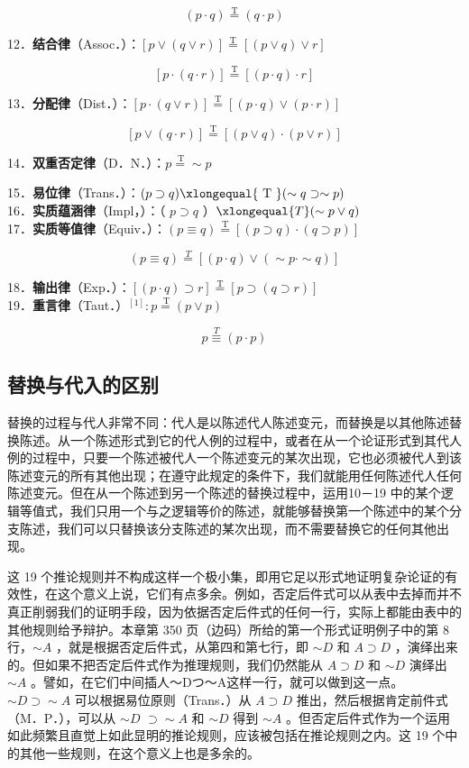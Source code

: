 $$
(p \cdot q) \stackrel{\mathrm{T}}{=}(q \cdot p)
$$

12．\textbf{结合律}（Assoc．）：$[p \vee(q \vee r)] \stackrel{\mathrm{T}}{=}[(p \vee q) \vee r]$

$$
[p \cdot(q \cdot r)] \stackrel{\mathrm{T}}{=}[(p \cdot q) \cdot r]
$$

13．\textbf{分配律}（Dist．）：$[p \cdot(q \vee r)] \stackrel{\mathrm{T}}{=}[(p \cdot q) \vee(p \cdot r)]$

$$
[p \vee(q \cdot r)] \stackrel{\mathrm{T}}{=}[(p \vee q) \cdot(p \vee r)]
$$

14．\textbf{双重否定律}（D．N．）：$p \stackrel{\mathrm{~T}}{=} \sim p$

15．\textbf{易位律}（Trans．）：$(p \supset q) \xlongequal{\text { T }}(\sim q \supset \sim p)$\\
16．\textbf{实质蕴涵律}（Impl，）：（ $p \supset q$ ）$\xlongequal{T}(\sim p \vee q)$\\
17．\textbf{实质等值律}（Equiv．）：$(p \equiv q) \stackrel{\mathrm{T}}{=}[(p \supset q) \cdot(q \supset p)]$

$$
(p \equiv q) \stackrel{T}{=}[(p \cdot q) \vee(\sim p \cdot \sim q)]
$$

18．\textbf{输出律}（Exp．）：$[(p \cdot q) \supset r] \stackrel{\mathrm{T}}{=}[p \supset(q \supset r)]$\\
19．\textbf{重言律}（Taut．）${ }^{[1]}: p \stackrel{\mathrm{~T}}{=}(p \vee p)$

$$
p \stackrel{T}{\equiv}(p \cdot p)
$$

\subsection{替换与代入的区别}

替换的过程与代人非常不同：代人是以陈述代人陈述变元，而替换是以其他陈述替换陈述。从一个陈述形式到它的代人例的过程中，或者在从一个论证形式到其代人例的过程中，只要一个陈述被代人一个陈述变元的某次出现，它也必须被代人到该陈述变元的所有其他出现；在遵守此规定的条件下，我们就能用任何陈述代人任何陈述变元。但在从一个陈述到另一个陈述的替换过程中，运用10－19 中的某个逻辑等值式，我们只用一个与之逻辑等价的陈述，就能够替换第一个陈述中的某个分支陈述，我们可以只替换该分支陈述的某次出现，而不需要替换它的任何其他出现。

这 19 个推论规则并不构成这样一个极小集，即用它足以形式地证明复杂论证的有效性，在这个意义上说，它们有点多余。例如，否定后件式可以从表中去掉而并不真正削弱我们的证明手段，因为依据否定后件式的任何一行，实际上都能由表中的其他规则给予辩护。本章第 350 页（边码）所给的第一个形式证明例子中的第 8 行，$\sim A$ ，就是根据否定后件式，从第四和第七行，即 $\sim D$ 和 $A \supset D$ ，演绎出来的。但如果不把否定后件式作为推理规则，我们仍然能从 $A \supset D$ 和 $\sim D$ 演绎出 $\sim A$ 。譬如，在它们中间插人～Dつ～A这样一行，就可以做到这一点。 $\sim D \supset \sim A$ 可以根据易位原则（Trans．）从 $A \supset D$ 推出，然后根据肯定前件式（M．P．），可以从 $\sim D$ $\supset \sim A$ 和 $\sim D$ 得到 $\sim A$ 。但否定后件式作为一个运用如此频繁且直觉上如此显明的推论规则，应该被包括在推论规则之内。这 19 个中的其他一些规则，在这个意义上也是多余的。

